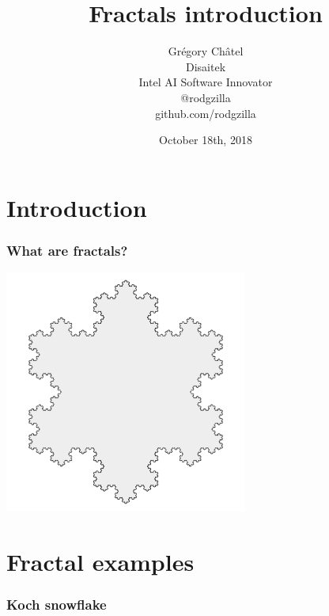 \documentclass[10pt]{beamer}
\title{Fractals introduction}
\author[G. Châtel]{Grégory Châtel\\\vspace{0.3cm}Disaitek\\Intel AI Software Innovator\\\vspace{0.3cm}@rodgzilla\\github.com/rodgzilla}
\date{October 18th, 2018}
\begin{document}
\begin{frame}

  \maketitle

\end{frame}

\section{Introduction}

\begin{frame}

  \frametitle{What are fractals?}

  \begin{center}
    \includegraphics[width = 8cm]{images/koch_snowflake.png}
  \end{center}

\end{frame}

\section{Fractal examples}

\begin{frame}
  \frametitle{Koch snowflake}

\end{frame}
\end{document}
